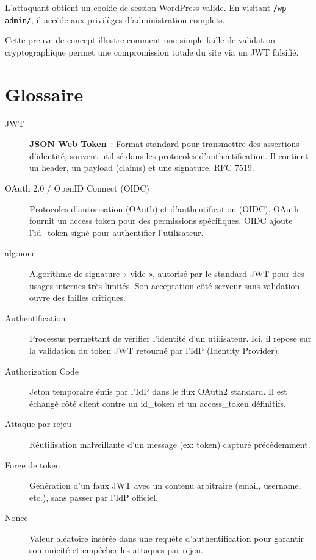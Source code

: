 \documentclass[a4paper,12pt]{article}
\begin{document}
L’attaquant obtient un cookie de session WordPress valide. En visitant \texttt{/wp-admin/}, il accède aux privilèges d’administration complets.

Cette preuve de concept illustre comment une simple faille de validation cryptographique permet une compromission totale du site via un JWT falsifié.

\section{Glossaire}
\begin{description}
  \item[JWT] \textbf{JSON Web Token}~: Format standard pour transmettre des assertions d’identité, souvent utilisé dans les protocoles d’authentification. Il contient un header, un payload (claims) et une signature. RFC 7519.
  
  \item[OAuth 2.0 / OpenID Connect (OIDC)] Protocoles d’autorisation (OAuth) et d’authentification (OIDC). OAuth fournit un access token pour des permissions spécifiques. OIDC ajoute l’id\_token signé pour authentifier l’utilisateur.
  
  \item[alg:none] Algorithme de signature « vide », autorisé par le standard JWT pour des usages internes très limités. Son acceptation côté serveur sans validation ouvre des failles critiques.

  \item[Authentification] Processus permettant de vérifier l’identité d’un utilisateur. Ici, il repose sur la validation du token JWT retourné par l’IdP (Identity Provider).
  
  \item[Authorization Code] Jeton temporaire émis par l’IdP dans le flux OAuth2 standard. Il est échangé côté client contre un id\_token et un access\_token définitifs.

  \item[Attaque par rejeu] Réutilisation malveillante d’un message (ex: token) capturé précédemment.

  \item[Forge de token] Génération d’un faux JWT avec un contenu arbitraire (email, username, etc.), sans passer par l’IdP officiel.

  \item[Nonce] Valeur aléatoire insérée dans une requête d’authentification pour garantir son unicité et empêcher les attaques par rejeu.


\end{description}
\end{document}
